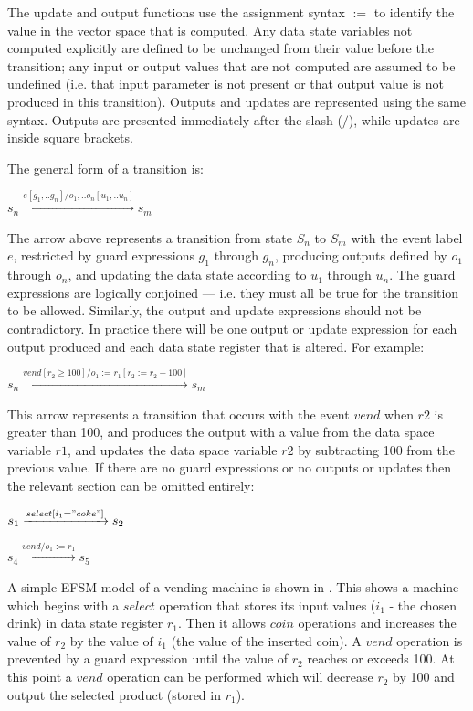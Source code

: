 The update and output functions use the assignment syntax $:=$ to identify the value in the vector space that is computed. Any data state variables not computed explicitly are defined to be unchanged from their value before the transition; any input or output values that are not computed are assumed to be undefined (i.e. that input parameter is not present or that output value is not produced in this transition). Outputs and updates are represented using the same syntax. Outputs are presented immediately after the slash ($/$), while updates are inside square brackets.

The general form of a transition is: 

\begin{center}
$s_n \xrightarrow{e[g_1, .. g_n]/o_1, .. o_n[u_1, .. u_n]} s_m$ 
\end{center}

The arrow above represents a transition from state $S_n$ to $S_m$ with the event label $e$, restricted by guard expressions $g_1$ through $g_n$, producing outputs defined by $o_1$ through $o_n$, and updating the data state according to $u_1$ through $u_n$. The guard expressions are logically conjoined --- i.e. they must all be true for the transition to be allowed. Similarly, the output and update expressions should not be contradictory. In practice there will be one output or update expression for each output produced and each data state register that is altered. For example:

\begin{center}
$s_n \xrightarrow{vend[r_{2} \geq 100]/o_{1} :=r_{1}[r_{2} := r_{2} - 100]} s_m$
\end{center}

This arrow represents a transition that occurs with the event $vend$ when $r2$ is greater than 100, and produces the output with a value from the data space variable $r1$, and updates the data space variable $r2$ by subtracting 100 from the previous value. If there are no guard expressions or no outputs or updates then the relevant section can be omitted entirely:

\begin{center}
$s_1 \xrightarrow{select[i_{1}="coke"]} s_2$

$s_4 \xrightarrow{vend/o_{1} := r_{1}} s_5$
\end{center}

A simple EFSM model of a vending machine is shown in . This shows a machine which begins with a $select$ operation that stores its input values ($i_1$ - the chosen drink) in data state register $r_1$. Then it allows $coin$ operations and increases the value of $r_2$ by the value of $i_1$ (the value of the inserted coin). A $vend$ operation is prevented by a guard expression until the value of $r_2$ reaches or exceeds 100. At this point a $vend$ operation can be performed which will decrease $r_2$ by 100 and output the selected product (stored in $r_1$).

